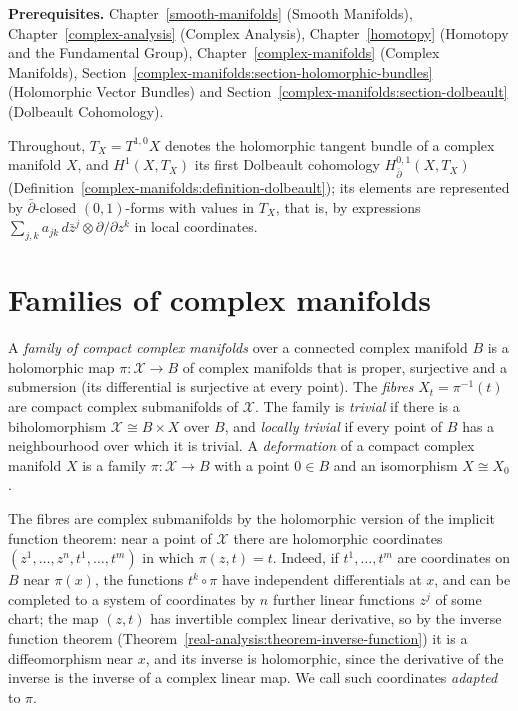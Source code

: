 \noindent\textbf{Prerequisites.} Chapter~\ref{smooth-manifolds} (Smooth Manifolds), Chapter~\ref{complex-analysis} (Complex Analysis), Chapter~\ref{homotopy} (Homotopy and the Fundamental Group),
Chapter~\ref{complex-manifolds} (Complex Manifolds), Section~\ref{complex-manifolds:section-holomorphic-bundles} (Holomorphic Vector Bundles) and Section~\ref{complex-manifolds:section-dolbeault} (Dolbeault Cohomology).

Throughout, $T_X = T^{1,0}X$ denotes the holomorphic tangent bundle of a complex manifold $X$, and $H^1(X, T_X)$ its first Dolbeault cohomology $H^{0,1}_{\bar\partial}(X, T_X)$
(Definition~\ref{complex-manifolds:definition-dolbeault}); its elements are represented by $\bar\partial$-closed $(0,1)$-forms with values in $T_X$, that is, by expressions
$\sum_{j,k}a_{jk}\,d\bar z^j \otimes \partial/\partial z^k$ in local coordinates.

\section{Families of complex manifolds}\label{deformations:section-families}

\begin{definition}\label{deformations:definition-family}
A \emph{family of compact complex manifolds} over a connected complex manifold $B$ is a holomorphic map $\pi \colon \mathcal{X} \to B$ of complex manifolds that is proper, surjective and a submersion
(its differential is surjective at every point). The \emph{fibres} $X_t = \pi^{-1}(t)$ are compact complex submanifolds of $\mathcal{X}$. The family is \emph{trivial} if there is a biholomorphism
$\mathcal{X} \cong B \times X$ over $B$, and \emph{locally trivial} if every point of $B$ has a neighbourhood over which it is trivial. A \emph{deformation} of a compact complex manifold $X$ is a family
$\pi \colon \mathcal{X} \to B$ with a point $0 \in B$ and an isomorphism $X \cong X_0$.
\end{definition}

The fibres are complex submanifolds by the holomorphic version of the implicit function theorem: near a point of $\mathcal{X}$ there are holomorphic coordinates $(z^1, \ldots, z^n, t^1, \ldots, t^m)$ in
which $\pi(z, t) = t$. Indeed, if $t^1, \ldots, t^m$ are coordinates on $B$ near $\pi(x)$, the functions $t^k \circ \pi$ have independent differentials at $x$, and can be completed to a system of
coordinates by $n$ further linear functions $z^j$ of some chart; the map $(z, t)$ has invertible complex linear derivative, so by the inverse function theorem
(Theorem~\ref{real-analysis:theorem-inverse-function}) it is a diffeomorphism near $x$, and its inverse is holomorphic, since the derivative of the inverse is the inverse of a complex linear map.
We call such coordinates \emph{adapted} to $\pi$.

